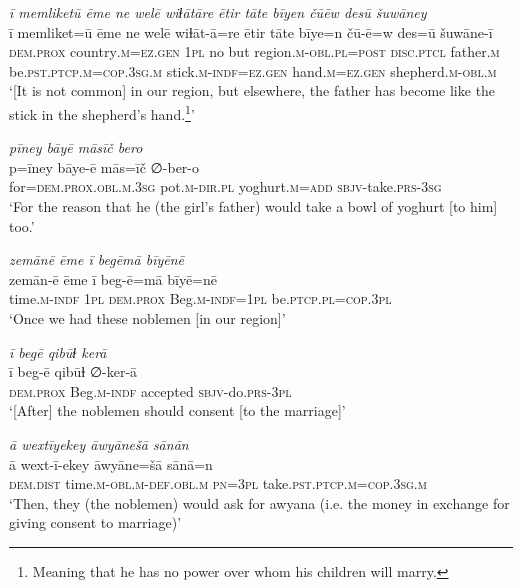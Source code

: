 \ea \label{RE.41}
\textit{ī memliketū ēme ne welē wiɫātāre ētir tāte bīyen čūēw desū šuwāney} \\ 
\gll ī memliket=ū ēme ne welē wiɫāt-ā=re ētir tāte bīye=n čū-ē=w des=ū šuwāne-ī \\ 
 \textsc{dem.prox} country\textsc{.m}\textsc{=ez.gen} \textsc{1pl} no but region\textsc{.m}\textsc{-obl}\textsc{.pl}\textsc{=\textsc{post}} \textsc{disc.ptcl} father\textsc{.m} be\textsc{.pst}\textsc{.ptcp}\textsc{.m}\textsc{=cop}\textsc{.3sg}\textsc{.m} stick\textsc{.m}\textsc{-indf}\textsc{=ez.gen} hand\textsc{.m}\textsc{=ez.gen} shepherd\textsc{.m}\textsc{-obl}\textsc{.m} \\ 
\glt `[It is not common] in our region, but elsewhere, the father has become like the stick in the shepherd’s hand.\footnote{Meaning that he has no power over whom his children will marry.}'
\z 
 
\ea \label{RE.52}
\textit{pīney bāyē māsīč bero} \\ 
\gll p=īney bāye-ē mās=īč ∅-ber-o \\ 
 for=\textsc{dem.prox}\textsc{.obl}\textsc{.m}\textsc{.3sg} pot\textsc{.m}\textsc{-dir}\textsc{.pl} yoghurt\textsc{.m}\textsc{=add} \textsc{sbjv-}take\textsc{.prs}\textsc{-3sg} \\ 
\glt `For the reason that he (the girl’s father) would take a bowl of yoghurt [to him] too.'
\z 
 
\ea \label{RE.56}
\textit{zemānē ēme ī begēmā bīyēnē} \\ 
\gll zemān-ē ēme ī beg-ē=mā bīyē=nē \\ 
 time\textsc{.m}\textsc{-indf} \textsc{1pl} \textsc{dem.prox} Beg\textsc{.m}\textsc{-indf}\textsc{=\textsc{1pl}} be\textsc{.ptcp}\textsc{.pl}\textsc{=cop}\textsc{.3pl} \\ 
\glt `Once we had these noblemen [in our region]'
\z 
 
\ea \label{RE.57}
\textit{ī begē qibūɫ kerā} \\ 
\gll ī beg-ē qibūɫ ∅-ker-ā \\ 
 \textsc{dem.prox} Beg\textsc{.m}\textsc{-indf} accepted \textsc{sbjv-}do\textsc{.prs}\textsc{-3pl} \\ 
\glt `[After] the noblemen should consent [to the marriage]'
\z 
 
\ea \label{RE.58}
\textit{ā wextīyekey āwyānešā sānān} \\ 
\gll ā wext-ī-ekey āwyāne=šā sānā=n \\ 
 \textsc{dem.dist} time\textsc{.m}\textsc{-obl}\textsc{.m}\textsc{-def}\textsc{.obl}\textsc{.m} \textsc{pn}\textsc{=3pl} take\textsc{.pst}\textsc{.ptcp}\textsc{.m}\textsc{=cop}\textsc{.3sg}\textsc{.m} \\ 
\glt `Then, they (the noblemen) would ask for awyana (i.e. the money in exchange for giving consent to marriage)'
\z 
 

